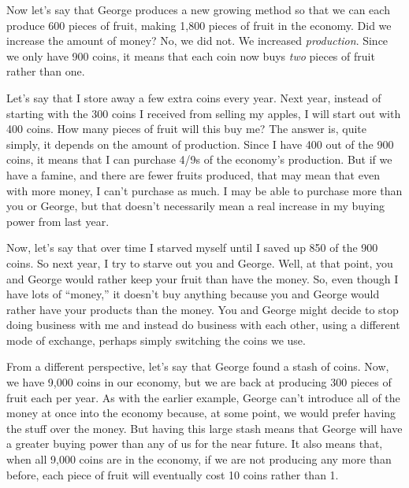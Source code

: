 \documentclass[letterpaper]{article}
\begin{document}
{\color{black}
Now let’s say that George produces a new growing method so that we can
each produce 600 pieces of fruit,
\textcolor[rgb]{0.32941177,0.5529412,0.83137256}{making} 1,800 pieces
of fruit in the economy. Did we increase the amount of money?  No, we
did not. We increased \textit{production}. Since we only have 900
coins, it means that each coin now buys \textit{two} pieces of fruit
rather than one.}

{\color{black}
Let’s say that I store away a few extra coins every year. Next year,
instead of starting with the 300 coins I received from selling my
apples, I will start out with 400 coins. How many pieces of fruit will
this buy me? The answer is, quite simply, it depends on the amount of
production. Since I have 400 out of the 900 coins, it means that I can
purchase 4/9s of the economy’s production. But if we have a famine, and
there are fewer fruits produced, that may mean that even with more
money, I can’t purchase as much. I may be able to purchase more than
you or George, but that doesn’t necessarily mean a real increase in my
buying power from last year.}

{\color{black}
Now, let’s say that over time I starved myself until I saved up 850 of
the 900 coins. So next year, I try to starve out you and George. Well,
at that point, you and George would rather keep your fruit than have
the money. So, even though I have lots of “money,” it doesn’t buy
anything because you and George would rather have your products than
the money. You and George might decide to stop doing business with me
and instead do business with each other, using a different mode of
exchange, perhaps simply switching the coins we use.}

{\color{black}
From a different perspective, let’s say that George found a stash of
coins. Now, we have 9,000 coins in our economy, but we are back at
producing 300 pieces of fruit each per year. As with the earlier
example, George can’t introduce all of the money at once into the
economy because, at some point, we would prefer having the stuff over
the money. But having this large stash means that George will have a
greater buying power than any of us for the near future. It also means
that, when all 9,000 coins are in the economy, if we are not producing
any more than before, each piece of fruit will eventually cost 10 coins
rather than 1. }
\end{document}
